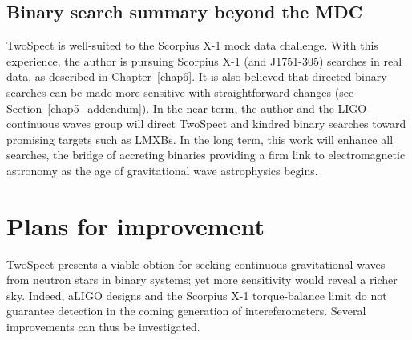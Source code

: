 \subsection{Binary search summary beyond the MDC}
TwoSpect is well-suited to the Scorpius X-1 mock data challenge.
With this experience, the author is pursuing Scorpius X-1 (and J1751-305) searches in real data, as described in Chapter~\ref{chap6}.
It is also believed that directed binary searches can be made more sensitive with straightforward changes (see Section~\ref{chap5_addendum}).
In the near term, the author and the LIGO continuous waves group will direct TwoSpect and kindred binary searches toward promising targets such as LMXBs.
In the long term, this work will enhance all searches, the bridge of accreting binaries providing a firm link to electromagnetic astronomy as the age of gravitational wave astrophysics begins.



%
%





\section{Plans for improvement}

TwoSpect presents a viable obtion for seeking continuous gravitational waves from neutron stars in binary systems; yet more sensitivity would reveal a richer sky.
Indeed, aLIGO designs and the Scorpius X-1 torque-balance limit do not guarantee detection in the coming generation of intereferometers.
Several improvements can thus be investigated.

